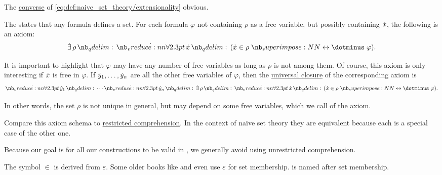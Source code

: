 \begin{definition}
\begin{thmenum}
    The \hyperref[def:conditional_formula/converse]{converse} of \eqref{eq:def:naive_set_theory/extensionality} obvious.

     The  states that any formula defines a set. For each formula \( \varphi \) not containing \( \rho \) as a free variable, but possibly containing \( {\dot{x}} \), the following is an axiom:
    \begin{equation}\label{eq:def:naive_set_theory/unrestricted_comprehension}
      \qexists \rho \qforall \synx (\synx \in \rho \syniff \varphi).
    \end{equation}

    It is important to highlight that \( \varphi \) may have any number of free variables as long as \( \rho \) is not among them. Of course, this axiom is only interesting if \( {\dot{x}} \) is free in \( \varphi \). If \( {\dot{y}}_1, \ldots, {\dot{y}}_n \) are all the other free variables of \( \varphi \), then the \hyperref[def:universal_closure]{universal closure} of the corresponding axiom is
    \begin{equation}\label{eq:def:naive_set_theory/unrestricted_comprehension_quantified}
      \qforall {\syny_1} \cdots \qforall {\syny_n} \qexists \rho \qforall \synx (\synx \in \rho \syniff \varphi).
    \end{equation}

    In other words, the set \( \rho \) is not unique in general, but may depend on some free variables, which we call  of the axiom.

    Compare this axiom schema to \hyperref[def:zfc/specification]{restricted comprehension}. In the context of na\"ive set theory they are equivalent because each is a special case of the other one.

    Because our goal is for all our constructions to be valid in \hyperref[def:zfc]{}, we generally avoid using unrestricted comprehension.
  \end{thmenum}
\end{definition}

\begin{remark}\label{rem:epsilon_and_set_membership}
  The symbol \( \in \) is derived from \( \varepsilon \). Some older books like \cite{Halmos1976MeasureTheory} and \cite{Kelley1975Topology} even use \( \varepsilon \) for set membership.  is named after set membership.
\end{remark}

